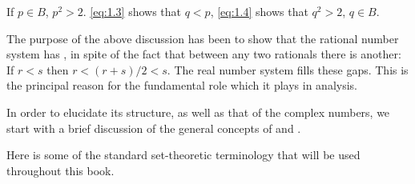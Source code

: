 If $p\in B$, $p^2>2$. \ref{eq:1.3} shows that $q<p$, \ref{eq:1.4} shows that $q^2>2$, $q\in B$.


\begin{myremark}
    \label{myremark:1.2}
    The purpose of the above discussion has been to show that 
    the rational number system has , 
    in spite of the fact that between any two rationals there is another: 
    If $r<s$ then $r<(r+s)/2<s$.
    The real number system fills these gaps.
    This is the principal reason for the fundamental role which it plays in analysis.
\end{myremark}


In order to elucidate its structure, as well as that of the complex numbers, 
we start with a brief discussion of the general concepts of  and .


Here is some of the standard set-theoretic terminology that will be used throughout this book.



